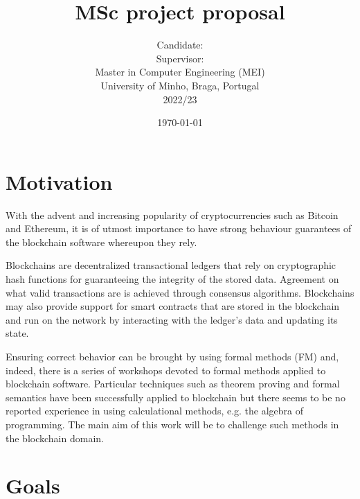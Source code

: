 \documentclass[a4paper, 11pt]{article} %
\title{\textbf{MSc project proposal}\\ \vspace{0.5cm}\msctitle}
\author{
	  Candidate:  \textsc{\msccandidate}
	\\Supervisor: \textsc{\mscsupervisor}
	\\
	\vspace{0.5cm}
    \normalsize{Master in Computer Engineering (MEI)\\ University of Minho, Braga, Portugal}
    \\ 2022/23
    } %
\date{\today}
\makeatletter
\renewcommand{\maketitle}{ %
\begin{center} %
{\LARGE\@title} %

\vspace{50pt} %

{\large\@author} %

\vspace{40pt} %
\end{center}
}
\makeatother
\begin{document}
\maketitle %






\section*{Motivation}

With the advent and increasing popularity of cryptocurrencies such as Bitcoin and Ethereum, it is of utmost importance to have strong behaviour guarantees of the blockchain software whereupon they rely.

Blockchains are decentralized transactional ledgers that rely on cryptographic hash functions for guaranteeing the integrity of the stored data. Agreement on what valid transactions are is achieved through consensus algorithms. Blockchains may also provide support for smart contracts that are stored in the blockchain and run on the network by interacting with the ledger’s data and updating its state. 

Ensuring correct behavior can be brought by using formal methods (FM) and, indeed, there is a series of workshops devoted to formal methods applied to blockchain software. Particular techniques such as theorem proving and formal semantics have been successfully applied to blockchain but there seems to be no reported experience in using calculational methods, e.g. the algebra of programming. The main aim of this work will be to challenge such methods in the blockchain domain.

\section*{Goals}
\end{document}
